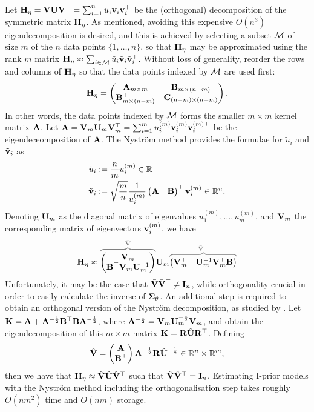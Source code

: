 Let ${\mathbf H}_\eta = {\mathbf V}{\mathbf U}{\mathbf V}^\top = \sum_{i=1}^n u_i {\mathbf v}_i {\mathbf v}_i^\top$ be the (orthogonal) decomposition of the symmetric matrix ${\mathbf H}_\eta$.
As mentioned, avoiding this expensive $O(n^3)$ eigendecomposition is desired, and this is achieved by selecting a subset ${\mathcal M}$ of size $m$ of the $n$ data points $\{1,\dots,n \}$, so that ${\mathbf H}_\eta$ may be approximated using the rank $m$ matrix ${\mathbf H}_\eta \approx \sum_{i\in{\mathcal M}} \tilde u_i \tilde{{\mathbf v}}_i\tilde{{\mathbf v}}_i^\top$.
Without loss of generality, reorder the rows and columns of ${\mathbf H}_\eta$ so that the data points indexed by ${\mathcal M}$ are used first:
%
\[
  {\mathbf H}_\eta =
  \begin{pmatrix}
    {\mathbf A}_{m\times m}         & {\mathbf B}_{m \times (n-m)} \\
    {\mathbf B}_{m \times (n-m)}^\top  & {\mathbf C}_{(n-m) \times (n-m)} \\
  \end{pmatrix}.
\]
%
In other words, the data points indexed by ${\mathcal M}$ forms the smaller $m\times m$ kernel matrix ${\mathbf A}$. 
Let ${\mathbf A} = {\mathbf V}_m{\mathbf U}_m{\mathbf V}_m^\top = \sum_{i=1}^m u_i^{(m)}{\mathbf v}_i^{(m)}{\mathbf v}_i^{(m)\top}$ be the eigendeceomposition of ${\mathbf A}$.
The Nyström method provides the formulae for $\tilde u_i$ and $\tilde{{\mathbf v}}_i$ as
\begin{align*}
  \tilde u_i &:= \frac{n}{m} u_i^{(m)} \in \mathbb{R} \\
  \tilde {{\mathbf v}}_i &:= \sqrt{\frac{m}{n}} \frac{1}{u_i^{(m)}}
  \begin{pmatrix}
    {\mathbf A} & {\mathbf B}
  \end{pmatrix}^\top
  {\mathbf v}_i^{(m)} \in \mathbb{R}^n.
\end{align*}
Denoting ${\mathbf U}_m$ as the diagonal matrix of eigenvalues $u_1^{(m)},\dots,u_m^{(m)}$, and ${\mathbf V}_m$ the corresponding matrix of eigenvectors ${\mathbf v}_i^{(m)}$, we have
\[
  \bH_\eta \approx
  {\color{gray}
  \overbrace{\color{black}
  \begin{pmatrix}
    \bV_m \\
    \bB^\top\bV_m\bU_m^{-1}
  \end{pmatrix}
  }^{\bar\bV}
  }
  \bU_m
  {\color{gray}
  \overbrace{\color{black}
  \begin{pmatrix}
    \bV_m^\top & \bU_m^{-1}\bV_m^\top\bB
  \end{pmatrix}
  }^{\bar\bV^\top}
  }
\]
Unfortunately, it may be the case that $\bar{{\mathbf V}}\bar{{\mathbf V}}^\top \neq {\mathbf I}_n$, while orthogonality crucial in order to easily calculate the inverse of ${\bm\Sigma}_\theta$.
An additional step is required to obtain an orthogonal version of the Nyström decomposition, as studied by \citet{fowlkes2001efficient}.
 Let ${\mathbf K} = {\mathbf A} + {\mathbf A}^{-\frac{1}{2}}{\mathbf B}^\top{\mathbf B}{\mathbf A}^{-\frac{1}{2}}$, where ${\mathbf A}^{-\frac{1}{2}} = {\mathbf V}_m{\mathbf U}_m^{-\frac{1}{2}}{\mathbf V}_m$, and obtain the eigendecomposition of this $m\times m$ matrix ${\mathbf K} = {\mathbf R}\hat{{\mathbf U}}{\mathbf R}^\top$.
 Defining
 \[
   \hat{{\mathbf V}} = 
   \begin{pmatrix}
     {\mathbf A} \\
     {\mathbf B}^\top
   \end{pmatrix}
   {\mathbf A}^{-\frac{1}{2}}{\mathbf R}\hat{{\mathbf U}}^{-\frac{1}{2}} \in \mathbb{R}^n \times \mathbb{R}^m,
 \]
 then we have that ${\mathbf H}_\eta \approx \hat{{\mathbf V}}\hat{{\mathbf U}}\hat{{\mathbf V}}^\top$ such that $\hat{{\mathbf V}}\hat{{\mathbf V}}^\top = {\mathbf I}_n$.
 Estimating I-prior models with the Nystr\"om method including the orthogonalisation step takes roughly $O(nm^2)$ time and $O(nm)$ storage.
 
